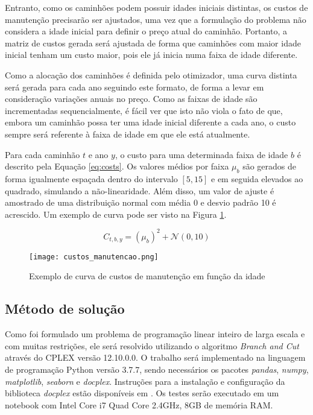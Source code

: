 \documentclass[conference]{IEEEtran}
\begin{document}
Entranto, como os caminhões podem possuir idades iniciais distintas, os custos de manutenção precisarão ser ajustados, uma vez que a formulação do problema não considera a idade inicial para definir o preço atual do caminhão. Portanto, a matriz de custos gerada será ajustada de forma que caminhões com maior idade inicial tenham um custo maior, pois ele já inicia numa faixa de idade diferente. 

Como a alocação dos caminhões é definida pelo otimizador, uma curva distinta será gerada para cada ano seguindo este formato, de forma a levar em consideração variações anuais no preço. Como as faixas de idade são incrementadas sequencialmente, é fácil ver que isto não viola o fato de que, embora um caminhão possa ter uma idade inicial diferente a cada ano, o custo sempre será referente à faixa de idade em que ele está atualmente.

Para cada caminhão $t$ e ano $y$, o custo para uma determinada faixa de idade $b$ é descrito pela Equação \ref{eq:costs}. Os valores médios por faixa $\mu_{b}$ são gerados de forma igualmente espaçada dentro do intervalo $[5,15]$ e em seguida elevados ao quadrado, simulando a não-linearidade. Além disso, um valor de ajuste é amostrado de uma distribuição normal com média 0 e desvio padrão 10 é acrescido. Um exemplo de curva pode ser visto na Figura \ref{fig:custo_manut}.

\begin{equation}
C_{t,b,y} = (\mu_{b})^2 + \mathcal{N}(0,10)
\label{eq:costs}
\end{equation}

\begin{figure}[h!]
	\centering
	\texttt{[image: custos\_manutencao.png]}
	\caption{Exemplo de curva de custos de manutenção em função da idade}
	\label{fig:custo_manut}
\end{figure}


\subsection{Método de solução}
Como foi formulado um problema de programação linear inteiro de larga escala e com muitas restrições, ele será resolvido utilizando o algoritmo \textit{Branch and Cut} através do CPLEX versão 12.10.0.0. O trabalho será implementado na linguagem de programação Python versão 3.7.7, sendo necessários os pacotes \textit{pandas}, \textit{numpy}, \textit{matplotlib}, \textit{seaborn} e \textit{docplex}. Instruções para a instalação e configuração da biblioteca \textit{docplex} estão disponíveis em \cite{docplex:online}. Os testes serão executado em um notebook com Intel Core i7 Quad Core 2.4GHz, 8GB de memória RAM.
\end{document}
